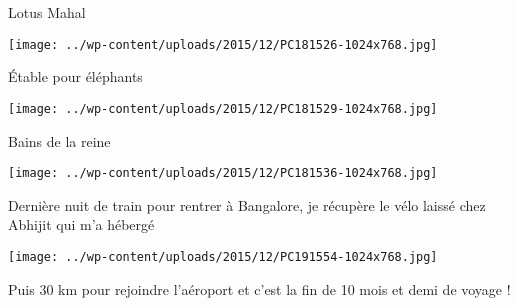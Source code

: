 Lotus Mahal
\begin{center} \texttt{[image: ../wp-content/uploads/2015/12/PC181526-1024x768.jpg]} \end{center}
\pagebreak

Étable pour éléphants 
\begin{center} \texttt{[image: ../wp-content/uploads/2015/12/PC181529-1024x768.jpg]} \end{center}

Bains de la reine 
\begin{center} \texttt{[image: ../wp-content/uploads/2015/12/PC181536-1024x768.jpg]} \end{center}
\pagebreak

Dernière nuit de train pour rentrer à Bangalore, je récupère le vélo laissé chez Abhijit qui m'a hébergé 
\begin{center} \texttt{[image: ../wp-content/uploads/2015/12/PC191554-1024x768.jpg]} \end{center}

Puis 30 km pour rejoindre l'aéroport et c'est la fin de 10 mois et demi de voyage !
